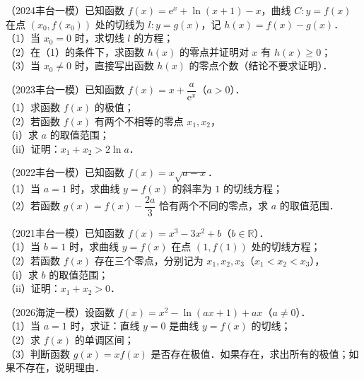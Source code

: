 \begin{example}
（2024丰台一模）已知函数 $f(x)=\mathrm{e}^x+\ln(x+1)-x$，曲线 $C:y=f(x)$ 在点 $(x_0,f(x_0))$ 处的切线为 $l:y=g(x)$，记 $h(x)=f(x)-g(x)$．\\
（1）当 $x_0=0$ 时，求切线 $l$ 的方程；\\
（2）在（1）的条件下，求函数 $h(x)$ 的零点并证明对 $x$ 有 $h(x)\geqslant0$；\\
（3）当 $x_0\neq0$ 时，直接写出函数 $h(x)$ 的零点个数（结论不要求证明）．
\end{example}

\begin{example}
（2023丰台一模）已知函数 $f(x)=x+\dfrac a{\mathrm{e}^x}$（$a>0$）．\\
（1）求函数 $f(x)$ 的极值；\\
（2）若函数 $f(x)$ 有两个不相等的零点 $x_1,x_2$，\\
（i）求 $a$ 的取值范围；\\
（ii）证明：$x_1+x_2>2\ln a$．
\end{example}

\begin{example}
（2022丰台一模）已知函数 $f(x)=x\sqrt{a-x}$．\\
（1）当 $a=1$ 时，求曲线 $y=f(x)$ 的斜率为 $1$ 的切线方程；\\
（2）若函数 $g(x)=f(x)-\dfrac{2a}{3}$ 恰有两个不同的零点，求 $a$ 的取值范围．
\end{example}

\begin{example}
（2021丰台一模）已知函数 $f(x)=x^3-3x^2+b$（$b\in\mathbb{R}$）．\\
（1）当 $b=1$ 时，求曲线 $y=f(x)$ 在点 $(1,f(1))$ 处的切线方程；\\
（2）若函数 $f(x)$ 存在三个零点，分别记为 $x_1,x_2,x_3$（$x_1<x_2<x_3$），\\
（i）求 $b$ 的取值范围；\\
（ii）证明：$x_1+x_2>0$．
\end{example}

\begin{example}
（2026海淀一模）设函数 $f(x)=x^2-\ln(ax+1)+ax$（$a\neq0$）．\\
（1）当 $a=1$ 时，求证：直线 $y=0$ 是曲线 $y=f(x)$ 的切线；\\
（2）求 $f(x)$ 的单调区间；\\
（3）判断函数 $g(x)=xf(x)$ 是否存在极值．如果存在，求出所有的极值；如果不存在，说明理由．
\end{example}


